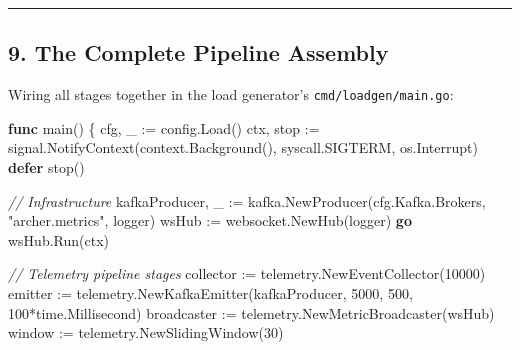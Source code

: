 \documentclass[
]{article}
\newenvironment{Shaded}{}{}
\newcommand{\CommentTok}[1]{\textcolor[rgb]{0.38,0.63,0.69}{\textit{#1}}}
\newcommand{\ControlFlowTok}[1]{\textcolor[rgb]{0.00,0.44,0.13}{\textbf{#1}}}
\newcommand{\DecValTok}[1]{\textcolor[rgb]{0.25,0.63,0.44}{#1}}
\newcommand{\KeywordTok}[1]{\textcolor[rgb]{0.00,0.44,0.13}{\textbf{#1}}}
\newcommand{\NormalTok}[1]{#1}
\newcommand{\OperatorTok}[1]{\textcolor[rgb]{0.40,0.40,0.40}{#1}}
\newcommand{\StringTok}[1]{\textcolor[rgb]{0.25,0.44,0.63}{#1}}
\begin{document}
\begin{center}\rule{0.5\linewidth}{0.5pt}\end{center}

\hypertarget{the-complete-pipeline-assembly}{%
\subsection{9. The Complete Pipeline
Assembly}\label{the-complete-pipeline-assembly}}

Wiring all stages together in the load generator's
\texttt{cmd/loadgen/main.go}:

\begin{Shaded}
\begin{Highlighting}[]
\KeywordTok{func}\NormalTok{ main}\OperatorTok{()} \OperatorTok{\{}
\NormalTok{    cfg}\OperatorTok{,}\NormalTok{ \_ }\OperatorTok{:=}\NormalTok{ config}\OperatorTok{.}\NormalTok{Load}\OperatorTok{()}
\NormalTok{    ctx}\OperatorTok{,}\NormalTok{ stop }\OperatorTok{:=}\NormalTok{ signal}\OperatorTok{.}\NormalTok{NotifyContext}\OperatorTok{(}\NormalTok{context}\OperatorTok{.}\NormalTok{Background}\OperatorTok{(),}\NormalTok{ syscall}\OperatorTok{.}\NormalTok{SIGTERM}\OperatorTok{,}\NormalTok{ os}\OperatorTok{.}\NormalTok{Interrupt}\OperatorTok{)}
    \ControlFlowTok{defer}\NormalTok{ stop}\OperatorTok{()}

    \CommentTok{// Infrastructure}
\NormalTok{    kafkaProducer}\OperatorTok{,}\NormalTok{ \_ }\OperatorTok{:=}\NormalTok{ kafka}\OperatorTok{.}\NormalTok{NewProducer}\OperatorTok{(}\NormalTok{cfg}\OperatorTok{.}\NormalTok{Kafka}\OperatorTok{.}\NormalTok{Brokers}\OperatorTok{,} \StringTok{"archer.metrics"}\OperatorTok{,}\NormalTok{ logger}\OperatorTok{)}
\NormalTok{    wsHub }\OperatorTok{:=}\NormalTok{ websocket}\OperatorTok{.}\NormalTok{NewHub}\OperatorTok{(}\NormalTok{logger}\OperatorTok{)}
    \ControlFlowTok{go}\NormalTok{ wsHub}\OperatorTok{.}\NormalTok{Run}\OperatorTok{(}\NormalTok{ctx}\OperatorTok{)}

    \CommentTok{// Telemetry pipeline stages}
\NormalTok{    collector   }\OperatorTok{:=}\NormalTok{ telemetry}\OperatorTok{.}\NormalTok{NewEventCollector}\OperatorTok{(}\DecValTok{10000}\OperatorTok{)}
\NormalTok{    emitter     }\OperatorTok{:=}\NormalTok{ telemetry}\OperatorTok{.}\NormalTok{NewKafkaEmitter}\OperatorTok{(}\NormalTok{kafkaProducer}\OperatorTok{,} \DecValTok{5000}\OperatorTok{,} \DecValTok{500}\OperatorTok{,} \DecValTok{100}\OperatorTok{*}\NormalTok{time}\OperatorTok{.}\NormalTok{Millisecond}\OperatorTok{)}
\NormalTok{    broadcaster }\OperatorTok{:=}\NormalTok{ telemetry}\OperatorTok{.}\NormalTok{NewMetricBroadcaster}\OperatorTok{(}\NormalTok{wsHub}\OperatorTok{)}
\NormalTok{    window      }\OperatorTok{:=}\NormalTok{ telemetry}\OperatorTok{.}\NormalTok{NewSlidingWindow}\OperatorTok{(}\DecValTok{30}\OperatorTok{)}


\end{Highlighting}
\end{Shaded}
\end{document}
